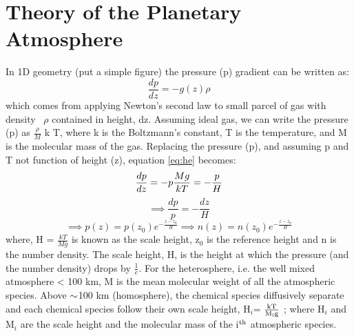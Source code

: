 \section{Theory of the Planetary Atmosphere}
In 1D geometry (put a simple figure) the pressure (p) gradient can be written as:
\begin{equation}
\label{eq:he}
\frac{dp}{dz} = -g(z) \rho
\end{equation}
which comes from applying Newton's second law to small parcel of gas with density ~$\rho$ contained in height, dz. Assuming ideal gas, we can write the pressure (p) as $\frac{\rho}{M}$ k T, where k is the Boltzmann's constant, T is the temperature, and M is the molecular mass of the gas. Replacing the pressure (p), and assuming p and T not function of height (z), equation \ref{eq:he} becomes:
\begin{equation*}
\frac{dp}{dz}= -p \frac{M g}{k T} = -\frac{p}{H}  \\
\end{equation*}
\begin{equation*}
\implies \frac{dp}{p}=-\frac{dz}{H}
\end{equation*}
\begin{equation}
\label{eq:p}
\implies p (z)= p(z_{0}) e^{-\frac{z-z_{0}}{H}} \implies n(z)= n(z_{0}) e^{-\frac{z-z_{0}}{H}} 
\end{equation}
where, H = $\frac{k T}{M g}$ is known as the scale height, z$_0$ is the reference height and n is the number density. The scale height, H, is the height at which the pressure (and the number density) drops by $\frac{1}{e}$.  For the heterosphere, i.e. the well mixed atmosphere < 100 km, M is the mean molecular weight of all the atmospheric species. Above $\rm \sim$100 km (homosphere), the chemical species diffusively separate and each chemical species follow their own scale height, H$_i$= $\rm \frac{k T}{M_{i} g}$ ; where H$_i$ and M$_i$ are the scale height and the molecular mass of the i$^{\rm th}$ atmospheric species.

